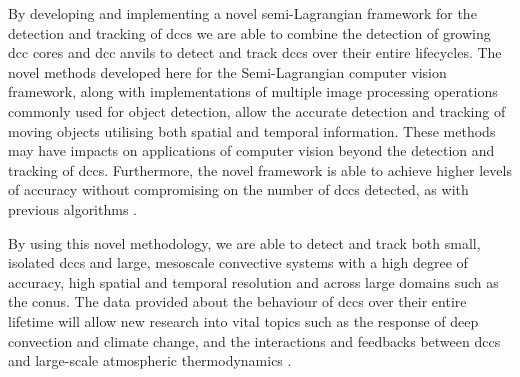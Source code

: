 By developing and implementing a novel semi-Lagrangian framework for the detection and tracking of \acrshort{dcc}s we are able to combine the detection of growing \acrshort{dcc} cores \citep{zinner_cb-tram_2008} and \acrshort{dcc} anvils \citep{muller_role_2018} to detect and track \acrshort{dcc}s over their entire lifecycles.
The novel methods developed here for the Semi-Lagrangian computer vision framework, along with implementations of multiple image processing operations commonly used for object detection, allow the accurate detection and tracking of moving objects utilising both spatial and temporal information.
These methods may have impacts on applications of computer vision beyond the detection and tracking of \acrshort{dcc}s.
Furthermore, the novel framework is able to achieve higher levels of accuracy without compromising on the number of \acrshort{dcc}s detected, as with previous algorithms \citep{muller_novel_2019}.



By using this novel methodology, we are able to detect and track both small, isolated \acrshort{dcc}s and large, mesoscale convective systems with a high degree of accuracy, high spatial and temporal resolution and across large domains such as the \acrshort{conus}.
The data provided about the behaviour of \acrshort{dcc}s over their entire lifetime will allow new research into vital topics such as the response of deep convection and climate change, and the interactions and feedbacks between \acrshort{dcc}s and large-scale atmospheric thermodynamics \citep{varble_erroneous_2018}.





